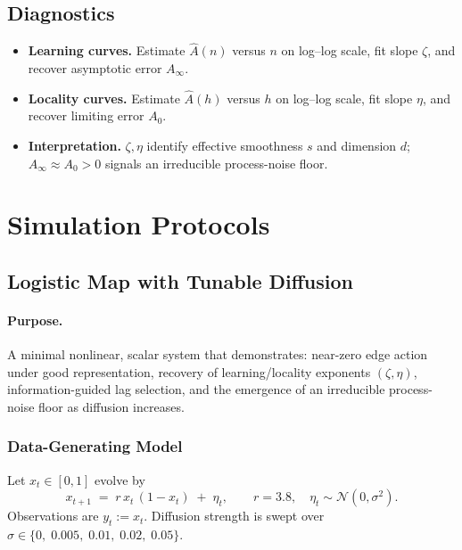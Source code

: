 \documentclass[11pt]{article}
\newcommand{\1}{\mathbf{1}}
\begin{document}
\subsection{Diagnostics}
\begin{itemize}
    \item \textbf{Learning curves.} Estimate $\hat A(n)$ versus $n$ on log--log scale, fit slope $\zeta$, and recover asymptotic error $A_\infty$.
    \item \textbf{Locality curves.} Estimate $\hat A(h)$ versus $h$ on log--log scale, fit slope $\eta$, and recover limiting error $A_0$.
    \item \textbf{Interpretation.} $\zeta,\eta$ identify effective smoothness $s$ and dimension $d$; $A_\infty \approx A_0 > 0$ signals an irreducible process-noise floor.
\end{itemize}

\section{Simulation Protocols}
\label{app:sim}

\subsection{Logistic Map with Tunable Diffusion}

\paragraph{Purpose.}
A minimal nonlinear, scalar system that demonstrates: near-zero edge action under good representation, recovery of learning/locality exponents $(\zeta,\eta)$, information-guided lag selection, and the emergence of an irreducible process-noise floor as diffusion increases.

\subsubsection{Data-Generating Model}
Let $x_t \in [0,1]$ evolve by
\[
x_{t+1} \;=\; r\,x_t\,(1-x_t) \;+\; \eta_t, 
\qquad r = 3.8,\quad \eta_t \sim \mathcal{N}(0,\sigma^2).
\]
Observations are $y_t := x_t$. Diffusion strength is swept over $\sigma \in \{0,\;0.005,\;0.01,\;0.02,\;0.05\}$.
\end{document}
